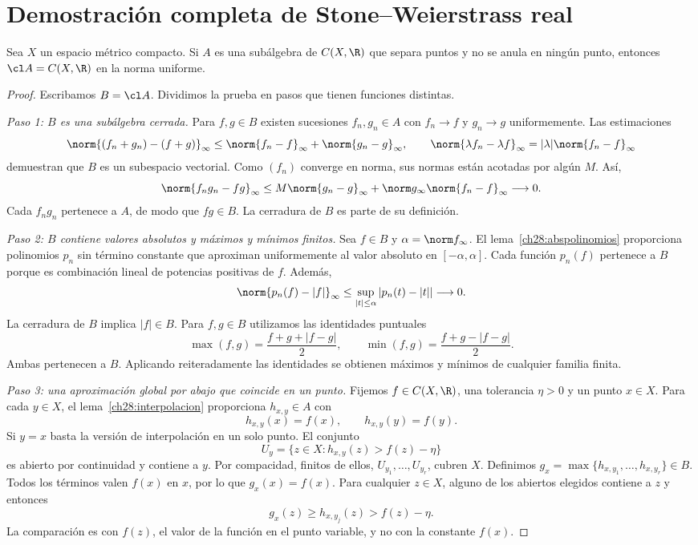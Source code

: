 \section{Demostración completa de Stone--Weierstrass real}
\begin{teorema}\label{ch28:stone}
Sea $X$ un espacio métrico compacto. Si $A$ es una subálgebra de $C(X,\R)$ que separa puntos y no se anula en ningún punto, entonces $\cl A=C(X,\R)$ en la norma uniforme.
\end{teorema}
\begin{proof}
Escribamos $B=\cl A$. Dividimos la prueba en pasos que tienen funciones distintas.

\emph{Paso 1: $B$ es una subálgebra cerrada.}
Para $f,g\in B$ existen sucesiones $f_n,g_n\in A$ con $f_n\to f$ y $g_n\to g$ uniformemente. Las estimaciones
\[
 \norm{(f_n+g_n)-(f+g)}_\infty
 \le\norm{f_n-f}_\infty+\norm{g_n-g}_\infty,
 \qquad\norm{\lambda f_n-\lambda f}_\infty=|\lambda|\norm{f_n-f}_\infty
\]
demuestran que $B$ es un subespacio vectorial. Como $(f_n)$ converge en norma, sus normas están acotadas por algún $M$. Así,
\[
 \norm{f_ng_n-fg}_\infty
 \le M\norm{g_n-g}_\infty+\norm g_\infty\norm{f_n-f}_\infty\longrightarrow0.
\]
Cada $f_ng_n$ pertenece a $A$, de modo que $fg\in B$. La cerradura de $B$ es parte de su definición.

\emph{Paso 2: $B$ contiene valores absolutos y máximos y mínimos finitos.}
Sea $f\in B$ y $\alpha=\norm f_\infty$. El lema~\ref{ch28:abspolinomios} proporciona polinomios $p_n$ sin término constante que aproximan uniformemente al valor absoluto en $[-\alpha,\alpha]$. Cada función $p_n(f)$ pertenece a $B$ porque es combinación lineal de potencias positivas de $f$. Además,
\[
 \norm{p_n(f)-|f|}_\infty
 \le\sup_{|t|\le\alpha}|p_n(t)-|t||\longrightarrow0.
\]
La cerradura de $B$ implica $|f|\in B$. Para $f,g\in B$ utilizamos las identidades puntuales
\[
 \max(f,g)=\frac{f+g+|f-g|}{2},\qquad
 \min(f,g)=\frac{f+g-|f-g|}{2}.
\]
Ambas pertenecen a $B$. Aplicando reiteradamente las identidades se obtienen máximos y mínimos de cualquier familia finita.

\emph{Paso 3: una aproximación global por abajo que coincide en un punto.}
Fijemos $f\in C(X,\R)$, una tolerancia $\eta>0$ y un punto $x\in X$. Para cada $y\in X$, el lema~\ref{ch28:interpolacion} proporciona $h_{x,y}\in A$ con
\[
 h_{x,y}(x)=f(x),\qquad h_{x,y}(y)=f(y).
\]
Si $y=x$ basta la versión de interpolación en un solo punto. El conjunto
\[
 U_y=\{z\in X:h_{x,y}(z)>f(z)-\eta\}
\]
es abierto por continuidad y contiene a $y$. Por compacidad, finitos de ellos, $U_{y_1},\ldots,U_{y_r}$, cubren $X$. Definimos
$g_x=\max\{h_{x,y_1},\ldots,h_{x,y_r}\}\in B$. Todos los términos valen $f(x)$ en $x$, por lo que $g_x(x)=f(x)$. Para cualquier $z\in X$, alguno de los abiertos elegidos contiene a $z$ y entonces
\[
 g_x(z)\ge h_{x,y_j}(z)>f(z)-\eta.
\]
La comparación es con $f(z)$, el valor de la función en el punto variable, y no con la constante $f(x)$.


\end{proof}
